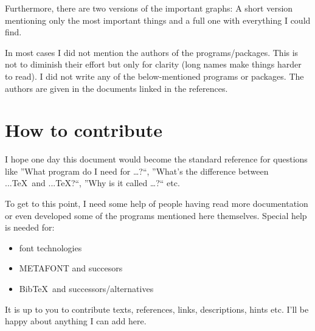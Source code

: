 \documentclass{scrartcl}
\begin{document}
Furthermore, there are two versions of the important graphs: A short version mentioning only the most important things and a full one with everything I could find.

In most cases I did not mention the authors of the programs/packages. This is not to diminish their effort but only for clarity (long names make things harder to read). I did not write any of the below-mentioned programs or packages. The authors are given in the documents linked in the references.

\section*{How to contribute}
I hope one day this document would become the standard reference for questions like ”What program do I need for …?“, ”What’s the difference between ...\TeX\ and ...\TeX?“, ”Why is it called …?“ etc.

To get to this point, I need some help of people having read more documentation or even developed some of the programs mentioned here themselves. Special help is needed for:
\begin{itemize}
\item font technologies
\item METAFONT and succesors
\item Bib\TeX\ and successors/alternatives
\end{itemize}

It is up to you to contribute texts, references, links, descriptions, hints etc. I’ll be happy about anything I can add here.

\clearpage
\tableofcontents
\clearpage
\end{document}

